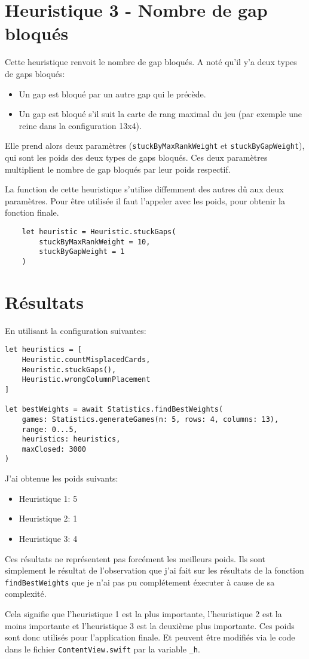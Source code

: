 \section{Heuristique 3 - Nombre de gap bloqués}
Cette heuristique renvoit le nombre de gap bloqués.
A noté qu'il y'a deux types de gaps bloqués:

\begin{itemize}
    \item Un gap est bloqué par un autre gap qui le précède.
    \item Un gap est bloqué s'il suit la carte de rang maximal du jeu (par exemple une reine dans la configuration 13x4).
\end{itemize}

Elle prend alors deux paramètres (\texttt{stuckByMaxRankWeight} et \texttt{stuckByGapWeight}), qui sont les poids des deux types de gaps bloqués. Ces deux paramètres multiplient le nombre de gap bloqués par leur poids respectif.

La function de cette heuristique s'utilise diffemment des autres dû aux deux paramètres. Pour être utilisée il faut l'appeler avec les poids, pour obtenir la fonction finale.
\begin{lstlisting}
    let heuristic = Heuristic.stuckGaps(
        stuckByMaxRankWeight = 10,
        stuckByGapWeight = 1
    )
\end{lstlisting}

\pagebreak

\section{Résultats}
En utilisant la configuration suivantes:
\begin{lstlisting}
let heuristics = [
    Heuristic.countMisplacedCards,
    Heuristic.stuckGaps(),
    Heuristic.wrongColumnPlacement
]

let bestWeights = await Statistics.findBestWeights(
    games: Statistics.generateGames(n: 5, rows: 4, columns: 13),
    range: 0...5,
    heuristics: heuristics,
    maxClosed: 3000
)
\end{lstlisting}

J'ai obtenue les poids suivants:
\begin{itemize}
    \item Heuristique 1: 5
    \item Heuristique 2: 1
    \item Heuristique 3: 4
\end{itemize}

Ces résultats ne représentent pas forcément les meilleurs poids. Ils sont simplement le résultat de l'observation que j'ai fait sur les résultats de la fonction \texttt{findBestWeights} que je n'ai pas pu complétement éxecuter à cause de sa complexité.

Cela signifie que l'heuristique 1 est la plus importante, l'heuristique 2 est la moins importante et l'heuristique 3 est la deuxième plus importante. Ces poids sont donc utilisés pour l'application finale. Et peuvent être modifiés via le code dans le fichier \texttt{ContentView.swift} par la variable \texttt{\_h}.
